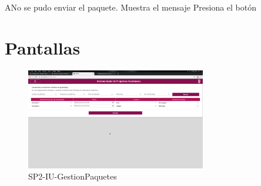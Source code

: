 \label{SP2-CU5-A}
\begin{UCtrayectoriaA}{A}{No se pudo enviar el paquete.}
    \UCpaso Muestra el mensaje 
    \UCpaso[\UCactor] Presiona el botón 
\end{UCtrayectoriaA}

\chapter{Pantallas}
 \begin{figure}
  \centering
    \includegraphics[width=0.7\textwidth]{DCU/SP2/Pantallas/GestionPaquetes}
  \caption{SP2-IU-GestionPaquetes}
  \label{SP2-IU-GestionPaquetes}
\end{figure}